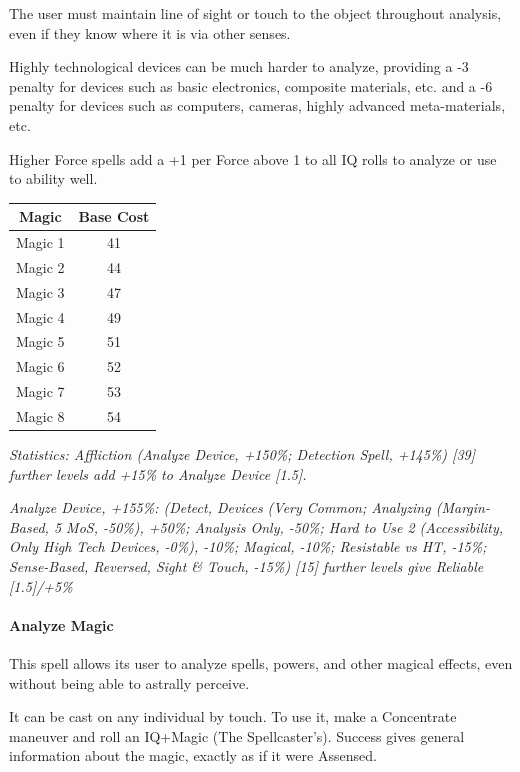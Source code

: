 \begin{multicols*}{3}
	The user must maintain line of sight or touch to the object throughout analysis, even if they know where it is via other senses.
	
	Highly technological devices can be much harder to analyze, providing a -3 penalty for devices such as basic electronics, composite materials, etc. and a -6 penalty for devices such as computers, cameras, highly advanced meta-materials, etc.
	
	Higher Force spells add a +1 per Force above 1 to all IQ rolls to analyze or use to ability well.
	
	\begin{center}
		\begin{tabular}{|c|c|}
			\hline
			Magic & Base Cost \\
			\hline
			\hline
			Magic 1 & 41 \\
			Magic 2 & 44 \\
			Magic 3 & 47 \\
			Magic 4 & 49 \\
			Magic 5 & 51 \\
			Magic 6 & 52 \\
			Magic 7 & 53 \\
			Magic 8 & 54 \\
			\hline
		\end{tabular}
	\end{center}
	
	\textcolor{OliveGreen}{\textit{ Statistics: Affliction (Analyze Device, +150\%; Detection Spell, +145\%) [39] further levels add +15\% to Analyze Device [1.5].}}
	
	\textcolor{OliveGreen}{\textit{Analyze Device, +155\%: (Detect, Devices (Very Common; Analyzing (Margin-Based, 5 MoS, -50\%), +50\%; Analysis Only, -50\%; Hard to Use 2 (Accessibility, Only High Tech Devices, -0\%), -10\%; Magical, -10\%; Resistable vs HT, -15\%; Sense-Based, Reversed, Sight \& Touch, -15\%) [15] further levels give Reliable [1.5]/+5\%}}
	
	\paragraph{Analyze Magic}
	
	This spell allows its user to analyze spells, powers, and other magical effects, even without being able to astrally perceive.
	
	It can be cast on any individual by touch. To use it, make a Concentrate maneuver and roll an IQ+Magic (The Spellcaster's). Success gives general information about the magic, exactly as if it were Assensed.
	

\end{multicols*}
